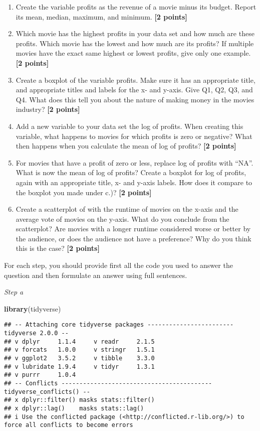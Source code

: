 \documentclass[
]{article}
\newenvironment{Shaded}{\begin{snugshade}}{\end{snugshade}}
\newcommand{\FunctionTok}[1]{\textcolor[rgb]{0.13,0.29,0.53}{\textbf{#1}}}
\newcommand{\NormalTok}[1]{#1}
\providecommand{\tightlist}{%
  \setlength{\itemsep}{0pt}\setlength{\parskip}{0pt}}
\begin{document}
\begin{enumerate}
\def\labelenumi{\alph{enumi}.}
\tightlist
\item
  Create the variable profits as the revenue of a movie minus its
  budget. Report its mean, median, maximum, and minimum.
  \textbf{[2 points]}
\item
  Which movie has the highest profits in your data set and how much are
  these profits. Which movie has the lowest and how much are its
  profits? If multiple movies have the exact same highest or lowest
  profits, give only one example. \textbf{[2 points]}
\item
  Create a boxplot of the variable profits. Make sure it has an
  appropriate title, and appropriate titles and labels for the x- and
  y-axis. Give Q1, Q2, Q3, and Q4. What does this tell you about the
  nature of making money in the movies industry? \textbf{[2 points]}
\item
  Add a new variable to your data set the log of profits. When creating
  this variable, what happens to movies for which profits is zero or
  negative? What then happens when you calculate the mean of log of
  profits? \textbf{[2 points]}
\item
  For movies that have a profit of zero or less, replace log of profits
  with ``NA''. What is now the mean of log of profits? Create a boxplot
  for log of profits, again with an appropriate title, x- and y-axis
  labels. How does it compare to the boxplot you made under c.)?
  \textbf{[2 points]}
\item
  Create a scatterplot of with the runtime of movies on the x-axis and
  the average vote of movies on the y-axis. What do you conclude from
  the scatterplot? Are movies with a longer runtime considered worse or
  better by the audience, or does the audience not have a preference?
  Why do you think this is the case? \textbf{[2 points]}
\end{enumerate}

For each step, you should provide first all the code you used to answer
the question and then formulate an answer using full sentences.

\emph{Step a}

\begin{Shaded}
\begin{Highlighting}[]
\FunctionTok{library}\NormalTok{(tidyverse)}
\end{Highlighting}
\end{Shaded}

\begin{verbatim}
## -- Attaching core tidyverse packages ------------------------ tidyverse 2.0.0 --
## v dplyr     1.1.4     v readr     2.1.5
## v forcats   1.0.0     v stringr   1.5.1
## v ggplot2   3.5.2     v tibble    3.3.0
## v lubridate 1.9.4     v tidyr     1.3.1
## v purrr     1.0.4     
## -- Conflicts ------------------------------------------ tidyverse_conflicts() --
## x dplyr::filter() masks stats::filter()
## x dplyr::lag()    masks stats::lag()
## i Use the conflicted package (<http://conflicted.r-lib.org/>) to force all conflicts to become errors
\end{verbatim}
\end{document}
